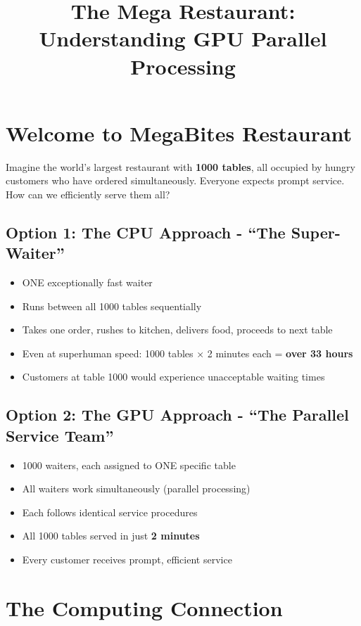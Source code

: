 \documentclass[11pt, a4paper]{article}
\title{The Mega Restaurant: Understanding GPU Parallel Processing}
\author{}
\date{}
\begin{document}
\maketitle

\section*{Welcome to MegaBites Restaurant}

Imagine the world's largest restaurant with \textbf{1000 tables}, all occupied by hungry customers who have ordered simultaneously. Everyone expects prompt service. How can we efficiently serve them all?

\subsection*{Option 1: The CPU Approach - \enquote{The Super-Waiter}}
\begin{itemize}
    \item ONE exceptionally fast waiter
    \item Runs between all 1000 tables sequentially
    \item Takes one order, rushes to kitchen, delivers food, proceeds to next table
    \item Even at superhuman speed: 1000 tables × 2 minutes each = \textbf{over 33 hours}
    \item Customers at table 1000 would experience unacceptable waiting times
\end{itemize}

\subsection*{Option 2: The GPU Approach - \enquote{The Parallel Service Team}}
\begin{itemize}
    \item 1000 waiters, each assigned to ONE specific table
    \item All waiters work simultaneously (parallel processing)
    \item Each follows identical service procedures
    \item All 1000 tables served in just \textbf{2 minutes}
    \item Every customer receives prompt, efficient service
\end{itemize}

\section*{The Computing Connection}
\end{document}
